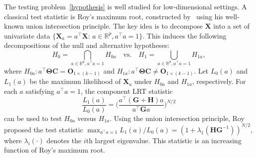 \documentclass[12pt]{article} %
\newcommand{\bX}{\mathbf{X}}
\newcommand{\bH}{\mathbf{H}}
\newcommand{\bG}{\mathbf{G}}
\newcommand{\bC}{\mathbf{C}}
\newcommand{\bO}{\mathbf{O}}
\newcommand{\bfsym}[1]{\ensuremath{\boldsymbol{#1}}}
\def\bTheta {\bfsym {\Theta}}
\theoremstyle{definition}
\begin{document}
The testing problem~\eqref{hypothesis} is well studied for low-dimensional settings.
A classical test statistic is Roy's maximum root, constructed by~\cite{Roy1953} using his well-known union intersection principle.
        The key idea is to decompose $\bX$ into a set of univariate data $\{\bX_{a}=a^\top \bX:\, a\in \mathbb{R}^p, a^\top a=1\}$.
        This induces the following decompositions of the null and alternative hypotheses:
        $$
        H_0=\bigcap_{a\in\mathbb{R}^p, a^\top a=1} H_{0a} \quad \text{vs.} \quad 
        H_1=\bigcup_{a\in\mathbb{R}^p, a^\top a=1} H_{1a},
        $$
        where 
 $H_{0a}: a^\top \bTheta \bC = \bO_{1\times (k-1)}$ and  $H_{1a} : a^\top \bTheta \bC \neq \bO_{1\times (k-1)}$.
Let $L_0(a)$ and $L_1(a)$ be the maximum likelihood of $\bX_a$ under $H_{0a}$ and $H_{1a}$, respectively.
For each $a$ satisfying $a^\top a=1$, the component LRT statistic
$$ \frac{L_1(a)}{L_0(a)}=\Big(\frac{a^\top(\bG+\bH) a}{a^\top \bG a}\Big)^{N/2}$$
can be used to test $H_{0a}$ versus $H_{1a}$. 
Using the union intersection principle, Roy proposed the test statistic
$
\max_{a^\top a=1}  {L_1(a)}/{L_0(a)}=(1+\lambda_{1}(\bH\bG^{-1}))^{N/2},
$
where $\lambda_{i}(\cdot)$ denotes the $i$th largest eigenvalue.
This statistic is an increasing function of Roy's maximum root.
\end{document}
